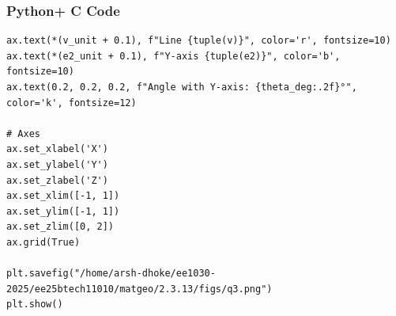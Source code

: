 \documentclass{beamer}
\begin{document}
\begin{frame}[fragile]
    \frametitle{Python+ C Code}
\begin{lstlisting}
ax.text(*(v_unit + 0.1), f"Line {tuple(v)}", color='r', fontsize=10)
ax.text(*(e2_unit + 0.1), f"Y-axis {tuple(e2)}", color='b', fontsize=10)
ax.text(0.2, 0.2, 0.2, f"Angle with Y-axis: {theta_deg:.2f}°", color='k', fontsize=12)

# Axes
ax.set_xlabel('X')
ax.set_ylabel('Y')
ax.set_zlabel('Z')
ax.set_xlim([-1, 1])
ax.set_ylim([-1, 1])
ax.set_zlim([0, 2])
ax.grid(True)

plt.savefig("/home/arsh-dhoke/ee1030-2025/ee25btech11010/matgeo/2.3.13/figs/q3.png")
plt.show()

\end{lstlisting}
\end{frame}
\end{document}
